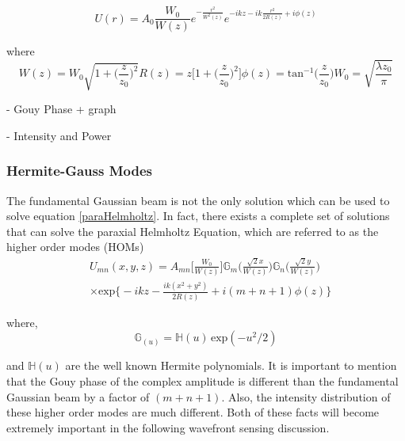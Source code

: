 \documentclass[oneside]{book}
\begin{document}
		\begin{equation}
		U(r) = A_0 \frac{W_0}{W(z)} e^{-\frac{r^2}{W^2(z)}} e^{-ikz - ik \frac{r^2}{2R(z)} + i \phi(z)}
		\end{equation}
		
		where
		\begin{subequations}
		\begin{equation}
		W(z) = W_0 \sqrt{1 + \bigg( \frac{z}{z_0} \bigg)^2}
		\end{equation}
		\begin{equation}\label{ROC}
		R(z) = z \bigg[ 1 + \bigg( \frac{z}{z_0} \bigg)^2 \bigg]
		\end{equation}
		\begin{equation}
		\phi(z)= \text{tan}^{-1}\bigg(\frac{z}{z_0}\bigg)
		\end{equation}
		\begin{equation}
		W_0 = \sqrt{\frac{\lambda z_0}{\pi}}
		\end{equation}
		\end{subequations}

		
		- Gouy Phase + graph
		
		- Intensity and Power
		
		\subsubsection{Hermite-Gauss Modes}
		The fundamental Gaussian beam is not the only solution which can be used to solve equation \ref{paraHelmholtz}.  In fact, there exists a complete set of solutions that can solve the paraxial Helmholtz Equation, which are referred to as the higher order modes (HOMs)
		\begin{equation}\label{HG}
		\begin{aligned}
		&U_{mn}(x,y,z) = A_{mn}\bigg[ \frac{W_0}{W(z)} \bigg] \mathbb{G}_m\Bigg( \frac{\sqrt{2}x}{W(z)}  \Bigg) \mathbb{G}_n\Bigg( \frac{\sqrt{2}y}{W(z)} \Bigg)\\
		&\times \text{exp} \bigg\{ -ikz - \frac{ik(x^2+y^2)}{2R(z)} + i(m+n+1)\phi(z) \bigg\}
		\end{aligned}
		\end{equation}
		
		where,
		\begin{equation}
		\mathbb{G}_(u) = \mathbb{H}(u) \, \text{exp}(-u^2/2)
		\end{equation}
		
		and $ \mathbb{H}(u)$ are the well known Hermite polynomials.  It is important to mention that the Gouy phase of the complex amplitude is different than the fundamental Gaussian beam by a factor of $(m + n + 1)$. Also, the intensity distribution of these higher order modes are much different. Both of these facts will become extremely important in the following wavefront sensing discussion.
		
\end{document}
